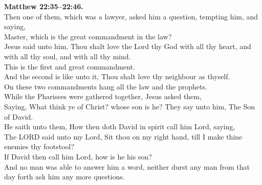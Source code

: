 \documentclass[10pt]{article} %
\begin{document}
{\begin{minipage}[t]{0.45\textwidth}
\textbf{Matthew 22:35--22:46.}\\
Then one of them, which was a lawyer, asked him a question, tempting him, and saying,\\
Master, which is the great commandment in the law?\\
Jesus said unto him, Thou shalt love the Lord thy God with all thy heart, and with all thy soul, and with all thy mind.\\
This is the first and great commandment.\\
And the second is like unto it, Thou shalt love thy neighbour as thyself.\\
On these two commandments hang all the law and the prophets.\\
While the Pharisees were gathered together, Jesus asked them,\\
Saying, What think ye of Christ? whose son is he? They say unto him, The Son of David.\\
He saith unto them, How then doth David in spirit call him Lord, saying,\\
The LORD said unto my Lord, Sit thou on my right hand, till I make thine enemies thy footstool?\\
If David then call him Lord, how is he his son?\\
And no man was able to answer him a word, neither durst any man from that day forth ask him any more questions.\\

\end{minipage}}
\vspace*{\fill}
\newpage
\huge%
\vspace*{\fill}
\begin{spacing}{1.0}
\end{spacing}
\vspace*{\fill}
\end{document}
